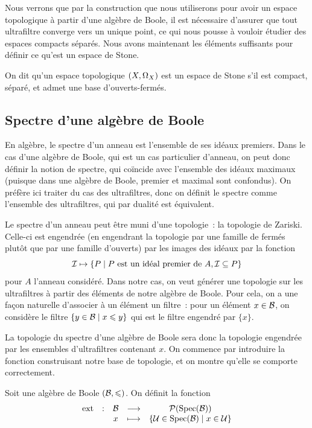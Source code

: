 Nous verrons que par la construction que nous utiliserons pour avoir un espace
topologique à partir d'une algèbre de Boole, il est nécessaire d'assurer que
tout ultrafiltre converge vers un unique point, ce qui nous pousse à vouloir
étudier des espaces compacts séparés. Nous avons maintenant les éléments
suffisants pour définir ce qu'est un espace de Stone.

\begin{definition}
  On dit qu'un espace topologique $(X,\Omega_{X})$ est un espace de Stone s'il
  est compact, séparé, et admet une base d'ouverts-fermés.
\end{definition}

\subsection{Spectre d'une algèbre de Boole}

En algèbre, le spectre d'un anneau est l'ensemble de ses idéaux premiers. Dans
le cas d'une algèbre de Boole, qui est un cas particulier d'anneau, on peut donc
définir la notion de spectre, qui coïncide avec l'ensemble des idéaux maximaux
(puisque dans une algèbre de Boole, premier et maximal sont confondus). On
préfère ici traiter du cas des ultrafiltres, donc on définit le spectre comme
l'ensemble des ultrafiltres, qui par dualité est équivalent.

Le spectre d'un anneau peut être muni d'une topologie~: la topologie de Zariski.
Celle-ci est engendrée (en engendrant la topologie par une famille de fermés
plutôt que par une famille d'ouverts) par les images des idéaux par la fonction
\[\mathcal{I} \mapsto
\left\{ P \;\middle\vert\; P\text{ est un idéal premier de } A, \mathcal{I}\subseteq P \right\}\]
pour $A$ l'anneau considéré. Dans notre cas, on veut générer une topologie
sur les ultrafiltres à partir des éléments de notre algèbre de Boole. Pour cela,
on a une façon naturelle d'associer à un élément un filtre~: pour un élément
$x\in \mathcal{B}$, on considère le filtre $\left\{ y \in \mathcal{B} \;\middle\vert\; x \leqslant y \right\}$ qui
est le filtre engendré par $\{x\}$.

La topologie du spectre d'une algèbre de Boole sera donc la topologie engendrée
par les ensembles d'ultrafiltres contenant $x$. On commence par introduire la
fonction construisant notre base de topologie, et on montre qu'elle se comporte
correctement.

\begin{definition}
  Soit une algèbre de Boole $(\mathcal{B},\leqslant)$. On définit la fonction
  \[
  \makeFun{\ext}{\varBB}{\powerset(\Spec(\varBB))}
          {x}{\compr{\varUlF\in\Spec(\varBB)}{x\in\varUlF}}
  \]
\end{definition}

